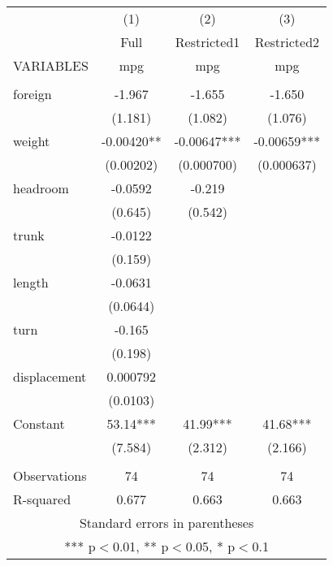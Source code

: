 \documentclass[]{article}
\begin{document}
\begin{tabular}{lccc} \hline
 & (1) & (2) & (3) \\
 & Full & Restricted1 & Restricted2 \\
VARIABLES & mpg & mpg & mpg \\ \hline
 &  &  &  \\
foreign & -1.967 & -1.655 & -1.650 \\
 & (1.181) & (1.082) & (1.076) \\
weight & -0.00420** & -0.00647*** & -0.00659*** \\
 & (0.00202) & (0.000700) & (0.000637) \\
headroom & -0.0592 & -0.219 &  \\
 & (0.645) & (0.542) &  \\
trunk & -0.0122 &  &  \\
 & (0.159) &  &  \\
length & -0.0631 &  &  \\
 & (0.0644) &  &  \\
turn & -0.165 &  &  \\
 & (0.198) &  &  \\
displacement & 0.000792 &  &  \\
 & (0.0103) &  &  \\
Constant & 53.14*** & 41.99*** & 41.68*** \\
 & (7.584) & (2.312) & (2.166) \\
 &  &  &  \\
Observations & 74 & 74 & 74 \\
 R-squared & 0.677 & 0.663 & 0.663 \\ \hline
\multicolumn{4}{c}{ Standard errors in parentheses} \\
\multicolumn{4}{c}{ *** p$<$0.01, ** p$<$0.05, * p$<$0.1} \\
\end{tabular}
\end{document}
